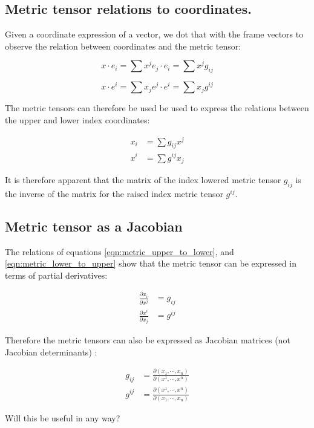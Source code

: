 \documentclass{article}      %
\begin{document}
\subsection{ Metric tensor relations to coordinates. }

Given a coordinate expression of a vector, we dot that with the frame vectors to observe the relation between coordinates and the metric tensor:

\[
x \cdot e_i = \sum x^j e_j \cdot e_i = \sum x^j g_{ij}
\]

\[
x \cdot e^i = \sum x_j e^j \cdot e^i = \sum x_j g^{ij}
\]

The metric tensors can therefore be used be used to express the relations between the upper and lower index coordinates:

\begin{align}
x_i &= \sum g_{ij} x^j \label{eqn:metric_upper_to_lower} \\
x^i &= \sum g^{ij} x_j \label{eqn:metric_lower_to_upper}
\end{align}

It is therefore apparent that the matrix of the index lowered metric tensor $g_{ij}$ is the inverse of the matrix for the raised index metric tensor $g^{ij}$.

\subsection{ Metric tensor as a Jacobian }

The relations of equations \ref{eqn:metric_upper_to_lower}, and \ref{eqn:metric_lower_to_upper} show that the metric tensor can be expressed in terms of partial derivatives:

\begin{align}
\frac{\partial x_i }{\partial x^j } &= g_{ij} \\
\frac{\partial x^i }{\partial x_j } &= g^{ij}
\end{align}

Therefore the metric tensors can also be expressed as Jacobian matrices (not Jacobian determinants) :

\begin{align}
g_{ij} &= \frac{\partial (x_1, \cdots, x_n) }{\partial (x^1, \cdots, x^n) } \\
g^{ij} &= \frac{\partial (x^1, \cdots, x^n) }{\partial (x_1, \cdots, x_n) }
\end{align}

Will this be useful in any way?
\end{document}
